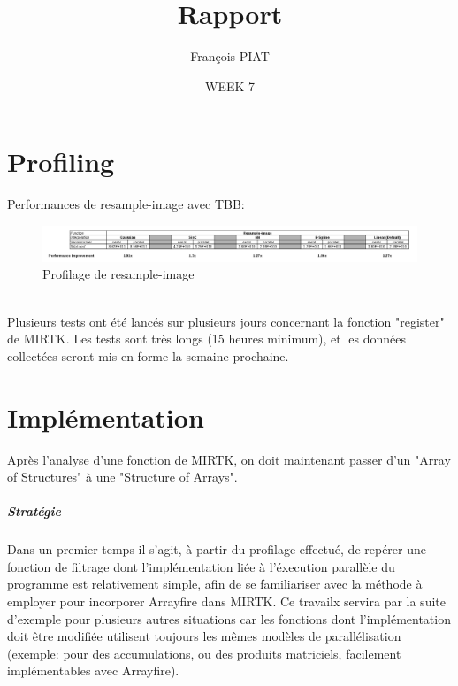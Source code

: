 \documentclass{report}
\title{Rapport}
\author{François PIAT}
\date{WEEK 7}
\begin{document}
\maketitle

\chapter*{Profiling}
Performances de resample-image avec TBB: 
\begin{figure}[h!]
	\begin{flushleft}
		\includegraphics[width=19cm]{figures/tbb_perf_resample-image.png}
	\end{flushleft}	
	\caption{Profilage de resample-image}
	\label{Profilage de resample-image}
\end{figure}
\\
Plusieurs tests ont été lancés sur plusieurs jours concernant la fonction "register" de MIRTK. Les tests sont très longs (15 heures minimum), et les données collectées seront mis en forme la semaine prochaine.
\chapter*{Implémentation}	
Après l'analyse d'une fonction de MIRTK, on doit maintenant passer d'un "Array of Structures" à une "Structure of Arrays".
\paragraph{Stratégie}
Dans un premier temps il s'agit, à partir du profilage effectué, de repérer une fonction de filtrage dont l'implémentation liée à l'éxecution parallèle du programme est relativement simple, afin de se familiariser avec la méthode à employer pour incorporer Arrayfire dans MIRTK.
Ce travailx servira par la suite d'exemple pour plusieurs autres situations car les fonctions dont l'implémentation doit être modifiée utilisent toujours les mêmes modèles de parallélisation (exemple: pour des accumulations, ou des produits matriciels, facilement implémentables avec Arrayfire).
\end{document}

